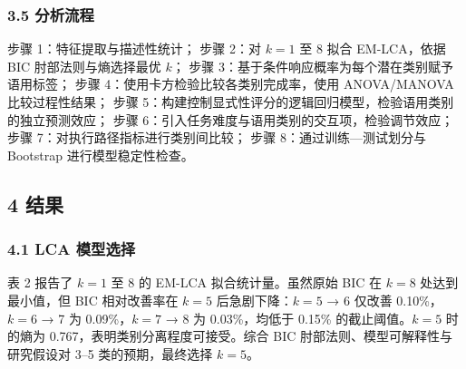 \documentclass[12pt,a4paper,openany,oneside]{ctexrep}
\begin{document}
\subsubsection{3.5 分析流程}


步骤 1：特征提取与描述性统计；
步骤 2：对 $k=1$ 至 8 拟合 EM-LCA，依据 BIC 肘部法则与熵选择最优 $k$；
步骤 3：基于条件响应概率为每个潜在类别赋予语用标签；
步骤 4：使用卡方检验比较各类别完成率，使用 ANOVA/MANOVA 比较过程性结果；
步骤 5：构建控制显式性评分的逻辑回归模型，检验语用类别的独立预测效应；
步骤 6：引入任务难度与语用类别的交互项，检验调节效应；
步骤 7：对执行路径指标进行类别间比较；
步骤 8：通过训练—测试划分与 Bootstrap 进行模型稳定性检查。

\subsection{4 结果}


\subsubsection{4.1 LCA 模型选择}


表 2 报告了 $k=1$ 至 8 的 EM-LCA 拟合统计量。虽然原始 BIC 在 $k=8$ 处达到最小值，但 BIC 相对改善率在 $k=5$ 后急剧下降：$k=5$ → 6 仅改善 0.10\%，$k=6$ → 7 为 0.09\%，$k=7$ → 8 为 0.03\%，均低于 0.15\% 的截止阈值。$k=5$ 时的熵为 0.767，表明类别分离程度可接受。综合 BIC 肘部法则、模型可解释性与研究假设对 3–5 类的预期，最终选择 $k=5$。


\begin{table}[htbp]
\centering
\caption{表 2：LCA 模型选择统计量}
\small
{}
\end{table}
\end{document}
